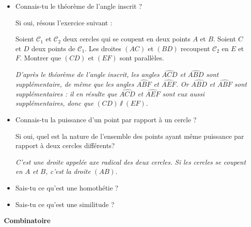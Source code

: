 \begin{itemize}
\item
Connais-tu le théorème de l'angle inscrit ?  \qquad {}  \qquad {}


Si oui, résous l'exercice suivant :

Soient $\mathscr{C}_1$ et $\mathscr{C}_2$ deux cercles qui se coupent en deux points $A$ et $B$. Soient $C$ et $D$ deux points de $\mathscr{C}_1$. Les droites $(AC)$ et $(BD)$ recoupent $\mathscr{C}_2$ en $E$ et $F$. Montrer que $(CD)$ et $(EF)$ sont parallèles.
%
%
%
\bigskip

\emph{D'après le théorème de l'angle inscrit, les angles $\widehat{ACD}$ et $\widehat{ABD}$ sont supplémentaire, de même que les angles $\widehat{ABF}$ et $\widehat{AEF}$. Or $\widehat{ABD}$ et $\widehat{ABF}$ sont supplémentaires : il en résulte que $\widehat{ACD}$ et $\widehat{AEF}$ sont eux aussi supplémentaires, donc que $(CD) \sslash (EF)$. }

\bigskip

\item
Connais-tu la puissance d'un point par rapport à un cercle ?  \qquad {}  \qquad {}

Si oui, quel est la nature de l'ensemble des points ayant même puissance par rapport à deux cercles différents?

\bigskip

\emph{C'est une droite appelée axe radical des deux cercles. Si les cercles se coupent en $A$ et $B$, c'est la droite $(AB)$.}

\bigskip

\item
Sais-tu ce qu'est une homothétie ?  \qquad {}  \qquad {}

\item
Sais-tu ce qu'est une similitude ?  \qquad {}  \qquad {}
\end{itemize}

\bigskip

{\Large\textbf{Combinatoire}}
\bigskip


